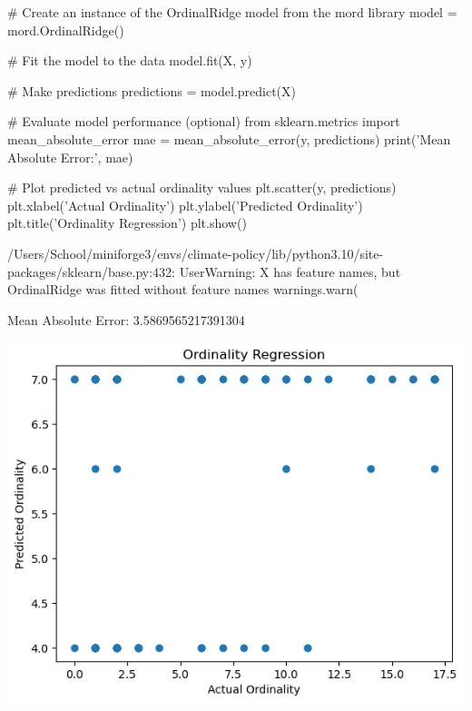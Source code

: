 \begin{pyin}
# Create an instance of the OrdinalRidge model from the mord library
model = mord.OrdinalRidge()

# Fit the model to the data
model.fit(X, y)

# Make predictions
predictions = model.predict(X)

# Evaluate model performance (optional)
from sklearn.metrics import mean_absolute_error
mae = mean_absolute_error(y, predictions)
print('Mean Absolute Error:', mae)

# Plot predicted vs actual ordinality values
plt.scatter(y, predictions)
plt.xlabel('Actual Ordinality')
plt.ylabel('Predicted Ordinality')
plt.title('Ordinality Regression')
plt.show()
\end{pyin}

\begin{pyprint}
/Users/School/miniforge3/envs/climate-policy/lib/python3.10/site-packages/sklearn/base.py:432: UserWarning: X has feature names, but OrdinalRidge was fitted without feature names
  warnings.warn(
\end{pyprint}

\begin{pyprint}
Mean Absolute Error: 3.5869565217391304
\end{pyprint}

\includegraphics[width=\textwidth]{./figs/fig_1.png}
